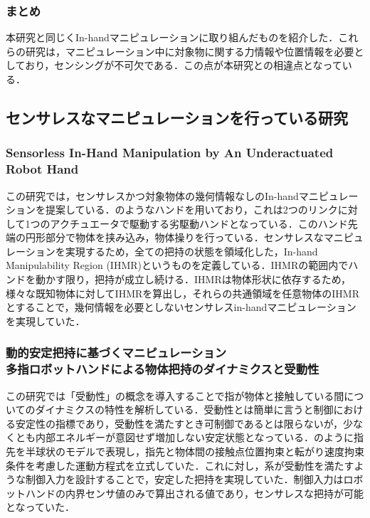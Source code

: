 \documentclass[a4paper,twoside,12pt,papersize, dvipdfmx]{iirthesis}
\begin{document}
\subsubsection{まとめ}
本研究と同じくIn-handマニピュレーションに取り組んだものを紹介した．これらの研究は，マニピュレーション中に対象物に関する力情報や位置情報を必要としており，センシングが不可欠である．この点が本研究との相違点となっている．


\subsection{センサレスなマニピュレーションを行っている研究}
\subsubsection{Sensorless In-Hand Manipulation by An Underactuated Robot Hand \cite{ospina2020}}	\label{sec::ospina}
この研究では，センサレスかつ対象物体の幾何情報なしのIn-handマニピュレーションを提案している．のようなハンドを用いており，これは2つのリンクに対して1つのアクチュエータで駆動する劣駆動ハンドとなっている．このハンド先端の円形部分で物体を挟み込み，物体操りを行っている．センサレスなマニピュレーションを実現するため，全ての把持の状態を領域化した，In-hand Manipulability Region (IHMR)というものを定義している．IHMRの範囲内でハンドを動かす限り，把持が成立し続ける．IHMRは物体形状に依存するため，様々な既知物体に対してIHMRを算出し，それらの共通領域を任意物体のIHMRとすることで，幾何情報を必要としないセンサレスin-handマニピュレーションを実現していた．

\subsubsection{動的安定把持に基づくマニピュレーション \cite{tahara2013}\\多指ロボットハンドによる物体把持のダイナミクスと受動性 \cite{tahara2020}}
この研究では「受動性」の概念を導入することで指が物体と接触している間についてのダイナミクスの特性を解析している．受動性とは簡単に言うと制御における安定性の指標であり，受動性を満たすとき可制御であるとは限らないが，少なくとも内部エネルギーが意図せず増加しない安定状態となっている．のように指先を半球状のモデルで表現し，指先と物体間の接触点位置拘束と転がり速度拘束条件を考慮した運動方程式を立式していた．これに対し，系が受動性を満たすような制御入力を設計することで，安定した把持を実現していた．制御入力はロボットハンドの内界センサ値のみで算出される値であり，センサレスな把持が可能となっていた．
\end{document}
